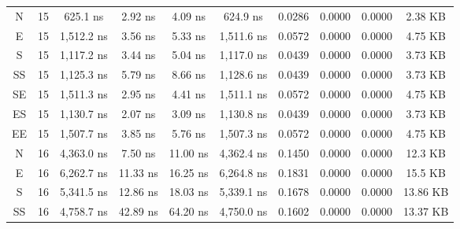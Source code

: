 \begin{sidewaystable}
\begin{tabular}{|c|c|c|c|c|c|c|c|c|c|}
        N       &   15      &   625.1 ns              &   2.92 ns           &   4.09 ns               &   624.9 ns              &   0.0286      &   0.0000      &   0.0000      &   2.38 KB          \\
        E       &   15      &   1,512.2 ns            &   3.56 ns           &   5.33 ns               &   1,511.6 ns            &   0.0572      &   0.0000      &   0.0000      &   4.75 KB          \\
        S       &   15      &   1,117.2 ns            &   3.44 ns           &   5.04 ns               &   1,117.0 ns            &   0.0439      &   0.0000      &   0.0000      &   3.73 KB          \\
        SS      &   15      &   1,125.3 ns            &   5.79 ns           &   8.66 ns               &   1,128.6 ns            &   0.0439      &   0.0000      &   0.0000      &   3.73 KB          \\
        SE      &   15      &   1,511.3 ns            &   2.95 ns           &   4.41 ns               &   1,511.1 ns            &   0.0572      &   0.0000      &   0.0000      &   4.75 KB          \\
        ES      &   15      &   1,130.7 ns            &   2.07 ns           &   3.09 ns               &   1,130.8 ns            &   0.0439      &   0.0000      &   0.0000      &   3.73 KB          \\
        EE      &   15      &   1,507.7 ns            &   3.85 ns           &   5.76 ns               &   1,507.3 ns            &   0.0572      &   0.0000      &   0.0000      &   4.75 KB          \\
        N       &   16      &   4,363.0 ns            &   7.50 ns           &   11.00 ns              &   4,362.4 ns            &   0.1450      &   0.0000      &   0.0000      &   12.3 KB          \\
        E       &   16      &   6,262.7 ns            &   11.33 ns          &   16.25 ns              &   6,264.8 ns            &   0.1831      &   0.0000      &   0.0000      &   15.5 KB          \\
        S       &   16      &   5,341.5 ns            &   12.86 ns          &   18.03 ns              &   5,339.1 ns            &   0.1678      &   0.0000      &   0.0000      &   13.86 KB         \\
        SS      &   16      &   4,758.7 ns            &   42.89 ns          &   64.20 ns              &   4,750.0 ns            &   0.1602      &   0.0000      &   0.0000      &   13.37 KB         \\

\end{tabular}
\end{sidewaystable}
